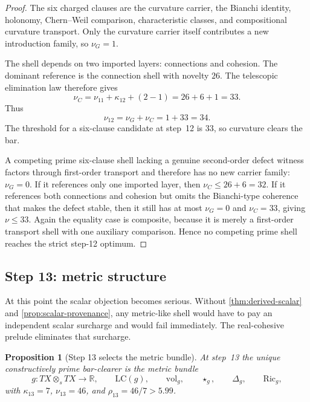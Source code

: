 \documentclass[11pt]{article}
\theoremstyle{plain}
\newtheorem{proposition}[theorem]{Proposition}
\theoremstyle{definition}
\theoremstyle{remark}
\newcommand{\R}{\mathbb{R}}
\newcommand{\lc}{\mathrm{LC}}
\newcommand{\Ric}{\mathrm{Ric}}
\newcommand{\vol}{\mathrm{vol}}
\begin{document}
\begin{proof}
The six charged clauses are the curvature carrier, the Bianchi identity, holonomy, Chern--Weil comparison, characteristic classes, and compositional curvature transport. Only the curvature carrier itself contributes a new introduction family, so $\nu_G=1$.

The shell depends on two imported layers: connections and cohesion. The dominant reference is the connection shell with novelty $26$. The telescopic elimination law therefore gives
\[
  \nu_C = \nu_{11}+\kappa_{12}+(2-1)=26+6+1=33.
\]
Thus
\[
  \nu_{12}=\nu_G+\nu_C=1+33=34.
\]
The threshold for a six-clause candidate at step~12 is $33$, so curvature clears the bar.

A competing prime six-clause shell lacking a genuine second-order defect witness factors through first-order transport and therefore has no new carrier family: $\nu_G=0$. If it references only one imported layer, then $\nu_C\le26+6=32$. If it references both connections and cohesion but omits the Bianchi-type coherence that makes the defect stable, then it still has at most $\nu_G=0$ and $\nu_C=33$, giving $\nu\le33$. Again the equality case is composite, because it is merely a first-order transport shell with one auxiliary comparison. Hence no competing prime shell reaches the strict step-12 optimum.
\end{proof}

\subsection{Step 13: metric structure}

At this point the scalar objection becomes serious. Without \cref{thm:derived-scalar} and \cref{prop:scalar-provenance}, any metric-like shell would have to pay an independent scalar surcharge and would fail immediately. The real-cohesive prelude eliminates that surcharge.

\begin{proposition}[Step 13 selects the metric bundle]
\label{prop:step13}
At step~13 the unique constructively prime bar-clearer is the metric bundle
\[
  g:TX\otimes_s TX\to\R,
  \qquad
  \lc(g),
  \qquad
  \vol_g,
  \qquad
  \star_g,
  \qquad
  \Delta_g,
  \qquad
  \Ric_g,
\]
with $\kappa_{13}=7$, $\nu_{13}=46$, and $\rho_{13}=46/7>5.99$.
\end{proposition}
\end{document}

